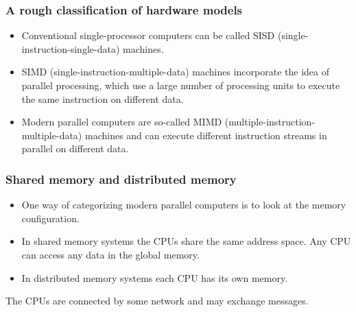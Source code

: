 \documentclass{beamer}
\begin{document}
\begin{frame}
\frametitle{A rough classification of hardware models}

\begin{block}{}

\begin{itemize}
\item Conventional single-processor computers can be called SISD (single-instruction-single-data) machines.

\item SIMD (single-instruction-multiple-data) machines incorporate the idea of parallel processing, which use a large number of processing units to execute the same instruction on different data.

\item Modern parallel computers are so-called MIMD (multiple-instruction-multiple-data) machines and can execute different instruction streams in parallel on different data.
\end{itemize}

\noindent
\end{block}
\end{frame}

\begin{frame}
\frametitle{Shared memory and distributed memory}

\begin{block}{}

\begin{itemize}
\item One way of categorizing modern parallel computers is to look at the memory configuration.

\item In shared memory systems the CPUs share the same address space. Any CPU can access any data in the global memory.

\item In distributed memory systems each CPU has its own memory.
\end{itemize}

\noindent
The CPUs are connected by some network and may exchange
messages.

\end{block}
\end{frame}
\end{document}
